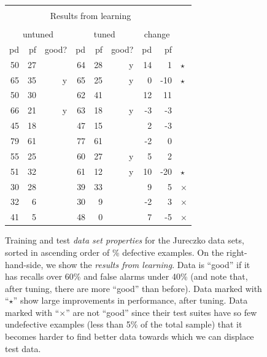 \documentclass[conference]{IEEEtran}
\begin{document}
\begin{figure}[!t]
\begin{center}
\begin{minipage}{.46\linewidth}
\begin{tabular}{r@{~}|l@{~}|r@{~}|l@{~}|r@{~}|r@{~}|}
        
    \end{tabular}\end{minipage}\begin{minipage}{.4\linewidth}
    \begin{tabular}{|rrr|rrr|rr|l} \cline{1-8}
      \multicolumn{8}{|c|}{  }\\
      \multicolumn{8}{|c|}{  Results from learning}\\
       \multicolumn{8}{|c|}{   }\\
   \multicolumn{3}{|c|}{untuned} & \multicolumn{3}{c|}{tuned} & \multicolumn{2}{c|}{change}\\
  \cline{1-8}
  
  pd & pf & good? & pd & pf & good? & pd & pf\\\cline{1-8}
  50 & 27 &   & 64 & 28 & y & 14 & 1&$\star$\\
  65 & 35 & y & 65 & 25 & y & 0 & -10&$\star$\\
  50 & 30 &   & 62 & 41 &   & 12 & 11\\
  66 & 21 & y & 63 & 18 & y & -3 & -3\\
  45 & 18 &   & 47 & 15 &   & 2 & -3\\
  79 & 61 &   & 77 & 61 &   & -2 & 0\\
  55 & 25 &   & 60 & 27 & y & 5 & 2\\
  51 & 32 &   & 61 & 12 & y & 10 & -20&$\star$\\
 30 & 28 &   & 39 & 33 &   & 9 & 5&$\times$\\
  32 & 6 &   & 30 & 9 &   & -2 & 3&$\times$\\
  41 & 5 &   & 48 & 0 &   & 7 & -5&$\times$\\
\hline 
\end{tabular}

\end{minipage}
\end{center}    
  
    \caption{Training and test {\em data set properties} for the Jureczko data sets,
    sorted in ascending order of \% defective examples.
    On the right-hand-side, we show the {\em results from learning}.
    Data is ``good'' if it has   recalls over 60\% and false alarms under 40\%
(and note that, after tuning, there are more ``good'' than before).
Data   marked with ``$\star$'' show large improvements in performance, after tuning.
Data   marked with ``$\times$'' are not ``good'' since their test suites  have so few undefective examples (less than 5\% of the total sample) that it becomes harder to find better data towards which we can displace test data.
}\label{fig:j}
\end{figure}
\end{document}
